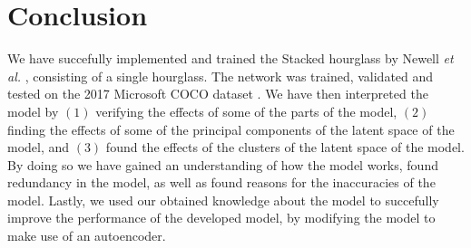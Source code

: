 \documentclass[./main.tex]{subfiles}
\begin{document}
\section{Conclusion}\label{sec:conclusion} 
We have succefully implemented and trained the Stacked hourglass by Newell \textit{et al.} \cite{Newell}, consisting of a single hourglass. The network was trained, validated and tested on the 2017 Microsoft COCO dataset \cite{COCO_article}. We have then interpreted the model by $(1)$ verifying the effects of some of the parts of the model, $(2)$ finding the effects of some of the principal components of the latent space of the model, and $(3)$ found the effects of the clusters of the latent space of the model. By doing so we have gained an understanding of how the model works, found redundancy in the model, as well as found reasons for the inaccuracies of the model. Lastly, we used our obtained knowledge about the model to succefully improve the performance of the developed model, by modifying the model to make use of an autoencoder.
\end{document}
